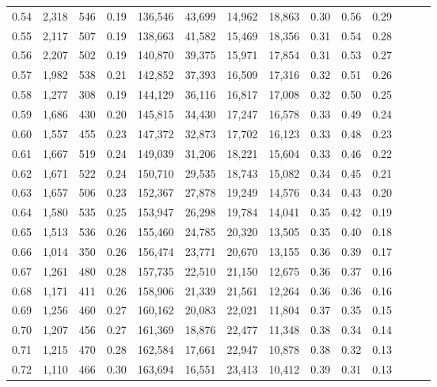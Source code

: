 \begin{tabular}{rrrrrrrrrrrrrr}
0.54 &  2,318 &  546 &  0.19 &  136,546 &   43,699 &  14,962 &  18,863 &  0.30 &  0.56 &      0.29 \\
0.55 &  2,117 &  507 &  0.19 &  138,663 &   41,582 &  15,469 &  18,356 &  0.31 &  0.54 &      0.28 \\
0.56 &  2,207 &  502 &  0.19 &  140,870 &   39,375 &  15,971 &  17,854 &  0.31 &  0.53 &      0.27 \\
0.57 &  1,982 &  538 &  0.21 &  142,852 &   37,393 &  16,509 &  17,316 &  0.32 &  0.51 &      0.26 \\
0.58 &  1,277 &  308 &  0.19 &  144,129 &   36,116 &  16,817 &  17,008 &  0.32 &  0.50 &      0.25 \\
0.59 &  1,686 &  430 &  0.20 &  145,815 &   34,430 &  17,247 &  16,578 &  0.33 &  0.49 &      0.24 \\
0.60 &  1,557 &  455 &  0.23 &  147,372 &   32,873 &  17,702 &  16,123 &  0.33 &  0.48 &      0.23 \\
0.61 &  1,667 &  519 &  0.24 &  149,039 &   31,206 &  18,221 &  15,604 &  0.33 &  0.46 &      0.22 \\
0.62 &  1,671 &  522 &  0.24 &  150,710 &   29,535 &  18,743 &  15,082 &  0.34 &  0.45 &      0.21 \\
0.63 &  1,657 &  506 &  0.23 &  152,367 &   27,878 &  19,249 &  14,576 &  0.34 &  0.43 &      0.20 \\
0.64 &  1,580 &  535 &  0.25 &  153,947 &   26,298 &  19,784 &  14,041 &  0.35 &  0.42 &      0.19 \\
0.65 &  1,513 &  536 &  0.26 &  155,460 &   24,785 &  20,320 &  13,505 &  0.35 &  0.40 &      0.18 \\
0.66 &  1,014 &  350 &  0.26 &  156,474 &   23,771 &  20,670 &  13,155 &  0.36 &  0.39 &      0.17 \\
0.67 &  1,261 &  480 &  0.28 &  157,735 &   22,510 &  21,150 &  12,675 &  0.36 &  0.37 &      0.16 \\
0.68 &  1,171 &  411 &  0.26 &  158,906 &   21,339 &  21,561 &  12,264 &  0.36 &  0.36 &      0.16 \\
0.69 &  1,256 &  460 &  0.27 &  160,162 &   20,083 &  22,021 &  11,804 &  0.37 &  0.35 &      0.15 \\
0.70 &  1,207 &  456 &  0.27 &  161,369 &   18,876 &  22,477 &  11,348 &  0.38 &  0.34 &      0.14 \\
0.71 &  1,215 &  470 &  0.28 &  162,584 &   17,661 &  22,947 &  10,878 &  0.38 &  0.32 &      0.13 \\
0.72 &  1,110 &  466 &  0.30 &  163,694 &   16,551 &  23,413 &  10,412 &  0.39 &  0.31 &      0.13 \\

\end{tabular}
